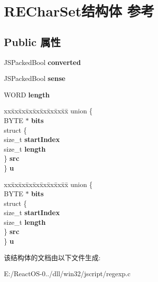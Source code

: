 \hypertarget{struct_r_e_char_set}{}\section{R\+E\+Char\+Set结构体 参考}
\label{struct_r_e_char_set}
\subsection*{Public 属性}
\begin{DoxyCompactItemize}
\item 
\mbox{\label{struct_r_e_char_set_a65a24308259bf0dde3570212f510f76e}} 
J\+S\+Packed\+Bool {\bfseries converted}
\item 
\mbox{\label{struct_r_e_char_set_ab2dda2c33fe01454cc672db06fa56e88}} 
J\+S\+Packed\+Bool {\bfseries sense}
\item 
\mbox{\label{struct_r_e_char_set_a1ea8cd9247d3841a0c989890560e9965}} 
W\+O\+RD {\bfseries length}
\item 
\mbox{\label{struct_r_e_char_set_aac1bf70772ca8da712ac6ee7f2c9e3e5}} 
\begin{tabbing}
xx\=xx\=xx\=xx\=xx\=xx\=xx\=xx\=xx\=\kill
union \{\\
\>BYTE $\ast$ {\bfseries bits}\\
\>struct \{\\
\>\>size\_t {\bfseries startIndex}\\
\>\>size\_t {\bfseries length}\\
\>\} {\bfseries src}\\
\} {\bfseries u}\\

\end{tabbing}\item 
\mbox{\label{struct_r_e_char_set_a614fa16f1c04bab78952b6875df4dd1d}} 
\begin{tabbing}
xx\=xx\=xx\=xx\=xx\=xx\=xx\=xx\=xx\=\kill
union \{\\
\>BYTE $\ast$ {\bfseries bits}\\
\>struct \{\\
\>\>size\_t {\bfseries startIndex}\\
\>\>size\_t {\bfseries length}\\
\>\} {\bfseries src}\\
\} {\bfseries u}\\

\end{tabbing}\end{DoxyCompactItemize}


该结构体的文档由以下文件生成\+:\begin{DoxyCompactItemize}
\item 
E\+:/\+React\+O\+S-\/0../dll/win32/jscript/regexp.\+c\end{DoxyCompactItemize}
